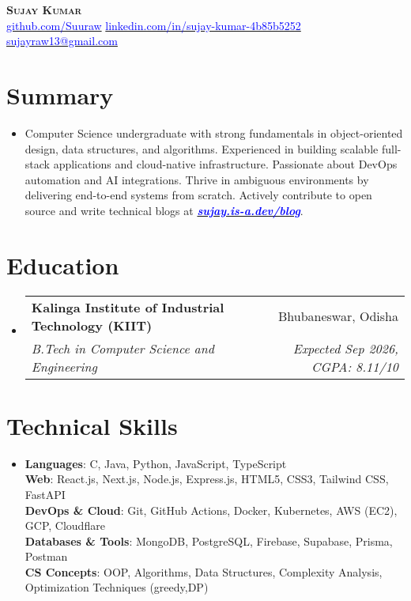 \documentclass[letterpaper,11pt]{article}
\makeatletter
\newcommand{\resumeSubheading}[4]{
  \vspace{-3pt}\item
  \begin{tabular*}{0.98\textwidth}[t]{l@{\extracolsep{\fill}}r}
    \textbf{#1} & #2 \\
    \textit{\small#3} & \textit{\small #4} \\
  \end{tabular*}\vspace{-6pt}
}
\newcommand{\resumeSubHeadingListStart}{\begin{itemize}[leftmargin=0.1in, label={}]}
\newcommand{\resumeSubHeadingListEnd}{\end{itemize}\vspace{-6pt}}
\makeatother
\begin{document}
\begin{center}
  \textbf{\Huge \scshape Sujay Kumar} \\ \vspace{8pt}
  \small
  \vspace{2pt}
 \href{https://github.com/Suuraw}{\textcolor{blue}{github.com/Suuraw}} \quad
\href{https://linkedin.com/in/sujay-kumar-4b85b5252}{\textcolor{blue}{linkedin.com/in/sujay-kumar-4b85b5252}} \quad
 \href{mailto:sujayraw13@gmail.com}{\textcolor{blue}{sujayraw13@gmail.com}} 
\end{center}
\vspace{-8pt}

\section{Summary}
\vspace{4pt}
\resumeSubHeadingListStart
\item{Computer Science undergraduate with strong fundamentals in object-oriented design, data structures, and algorithms. Experienced in building scalable full-stack applications and cloud-native infrastructure. Passionate about DevOps automation and AI integrations. Thrive in ambiguous environments by delivering end-to-end systems from scratch. Actively contribute to open source and write technical blogs at \href{https://sujay.is-a.dev/blog}{\textcolor{blue}{\textbf{\textit{sujay.is-a.dev/blog}}}}.}
\resumeSubHeadingListEnd

\section{Education}
\vspace{4pt}
\resumeSubHeadingListStart
  \resumeSubheading{Kalinga Institute of Industrial Technology (KIIT)}{Bhubaneswar, Odisha}{B.Tech in Computer Science and Engineering}{Expected Sep 2026, CGPA: 8.11/10}
\resumeSubHeadingListEnd

\section{Technical Skills}
\vspace{4pt}
\resumeSubHeadingListStart
  \item{
    \textbf{Languages}: C, Java, Python, JavaScript, TypeScript \\ \vspace{2pt}
    \textbf{Web}: React.js, Next.js, Node.js, Express.js, HTML5, CSS3, Tailwind CSS, FastAPI \\ \vspace{2pt}
    \textbf{DevOps \& Cloud}: Git, GitHub Actions, Docker, Kubernetes, AWS (EC2), GCP, Cloudflare \\ \vspace{2pt}
    \textbf{Databases \& Tools}: MongoDB, PostgreSQL, Firebase, Supabase, Prisma, Postman \\ \vspace{2pt}
    \textbf{CS Concepts}: OOP, Algorithms, Data Structures, Complexity Analysis, Optimization Techniques (greedy,DP)
  }
\resumeSubHeadingListEnd
\end{document}
